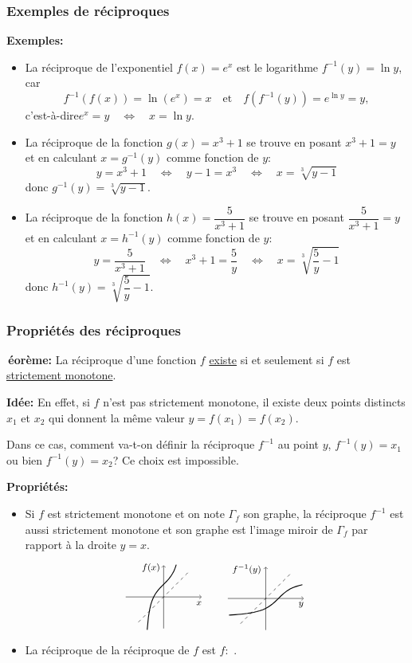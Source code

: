 \documentclass[10pt]{beamer}
\newcommand{\bitem}{\item[$\bullet$]}
\renewcommand{\th}{\mathrm{th}\,}
\begin{document}
\begin{frame}[plain]
\frametitle{\bf Exemples de r\'eciproques}
\medskip 

{\small 
{\bf Exemples:}
\begin{itemize}
\bitem
La r\'eciproque de l'exponentiel $f(x)=e^x$ est le logarithme 
$f^{-1}(y)=\ln y$, car 
$$
f^{-1}(f(x))=\ln(e^x)=x \quad\mbox{et}\quad 
f(f^{-1}(y))=e^{\ln y}=y, 
$$
c'est-\`a-dire\quad $e^x=y\quad\Longleftrightarrow\quad x=\ln y$. 
\vspace*{2mm}

\pause
\bitem
La r\'eciproque de la fonction $g(x)=x^3+1$ se trouve en posant $x^3+1=y$ 
et en calculant $x=g^{-1}(y)$ comme fonction de $y$: 
$$
y=x^3+1 \quad\Longleftrightarrow\quad y-1=x^3 \quad\Longleftrightarrow\quad 
x=\sqrt[3]{y-1}
$$
donc $g^{-1}(y)=\sqrt[3]{y-1}$. 
\vspace*{2mm}

\pause
\bitem
La r\'eciproque de la fonction $h(x)=\dfrac{5}{x^3+1}$ se trouve en posant 
$\dfrac{5}{x^3+1}=y$ et en calculant $x=h^{-1}(y)$ comme fonction de $y$: 
$$
y=\dfrac{5}{x^3+1} \quad\Longleftrightarrow\quad x^3+1=\dfrac{5}{y} 
\quad\Longleftrightarrow\quad 
x=\sqrt[3]{\dfrac{5}{y}-1}
$$
donc $h^{-1}(y)=\sqrt[3]{\dfrac{5}{y}-1}$. 
\end{itemize}

}

\end{frame}


\begin{frame}
\frametitle{\bf Propri\'et\'es des r\'eciproques}
\medskip 

{\bf \th\'eor\`eme:}\quad 
La r\'eciproque d'une fonction $f$ \underline{existe} si et seulement si 
$f$ est \underline{strictement monotone}. 
\vspace*{1mm}

\pause
{\small 
{\bf Id\'ee:}\quad 
En effet, si $f$ n'est pas strictement monotone, il existe deux points 
distincts $x_1$ et $x_2$ qui donnent la m\^eme valeur $y=f(x_1)=f(x_2)$. 

Dans ce cas, comment va-t-on d\'efinir la r\'eciproque $f^{-1}$ au point $y$, 
$f^{-1}(y)=x_1$ ou bien $f^{-1}(y)=x_2$? Ce choix est impossible.}
\vspace*{1mm}

\pause
{\bf Propri\'et\'es:}
\begin{itemize}
\bitem
Si $f$ est strictement monotone et on note $\Gamma_f$ son graphe, 
la r\'eciproque $f^{-1}$ est aussi strictement monotone et son graphe 
est l'image miroir de $\Gamma_f$ par rapport \`a la droite $y=x$. 
$$
\grapheFF \qquad \grapheFFINV
$$

\pause
\bitem
La r\'eciproque de la r\'eciproque de $f$ est $f$:\ 
.
\end{itemize}

\end{frame}
\end{document}
